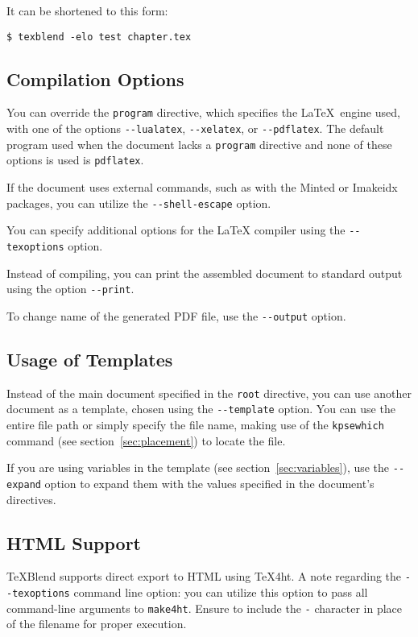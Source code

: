 It can be shortened to this form:

\begin{verbatim}
$ texblend -elo test chapter.tex
\end{verbatim}



\subsection{Compilation Options}

You can override the \verb'program' directive, which specifies the \LaTeX\ engine
used, with one of the options \verb|--lualatex|, \verb|--xelatex|, or \verb|--pdflatex|. 
The default program used when the document lacks a \verb'program' directive and none of these
options is used is \verb|pdflatex|.

If the document uses external commands, such as with the Minted or Imakeidx
packages, you can utilize the \verb|--shell-escape| option.

You can specify additional options for the LaTeX compiler using the \verb|--texoptions| option.

Instead of compiling, you can print the assembled document to standard output
using the option \verb|--print|.

To change name of the generated PDF file, use the \verb|--output| option.


\subsection{Usage of Templates}


Instead of the main document specified in the \verb'root' directive, you can use
another document as a template, chosen using the \verb|--template| option. You
can use the entire file path or simply specify the file name, making use of the
\verb'kpsewhich' command (see section~\ref{sec:placement}) to locate the file.

If you are using variables in the template (see section~\ref{sec:variables}), use the
\verb'--expand' option to expand them with the values specified in the document's
directives.




\subsection{HTML Support}

\TeX Blend supports direct export to HTML using \TeX4ht. A note regarding the
\verb|--texoptions| command line option: you can utilize this option to pass all
command-line arguments to \verb|make4ht|. Ensure to include the \verb|-| character in place
of the filename for proper execution.

